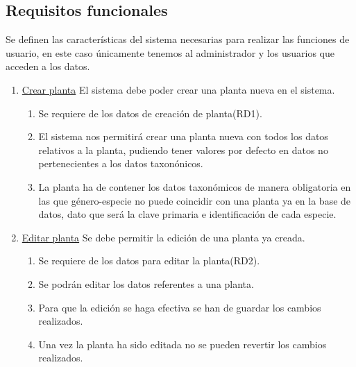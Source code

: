 \documentclass[10pt,a4paper]{article}
\begin{document}
\subsection{\textbf{Requisitos funcionales}}

Se definen las características del sistema necesarias para realizar las funciones de usuario, en este caso únicamente tenemos al administrador y los usuarios que acceden a los datos.

\bigskip

\begin{enumerate}[label=RF\arabic*. ,leftmargin=2.8\parindent]
	\item \underline{Crear planta}
	 \newline 
	 \newline
	El sistema debe poder crear una planta nueva en el sistema.
	\begin{enumerate}[label=-]
	
		\item Se requiere de los datos de creación de planta(RD1).
		\item El sistema nos permitirá crear una planta nueva con todos los datos relativos a la planta, pudiendo tener valores por defecto en datos no pertenecientes a los datos taxonónicos.
		\item La planta ha de contener los datos taxonómicos de manera obligatoria en las que género-especie no puede coincidir con una planta ya en la base de datos, dato que será la clave primaria e identificación de cada especie.
		
	\end{enumerate}

	\bigskip
	\item \underline{Editar planta}
	\newline \newline
	Se debe permitir la edición de una planta ya creada.
	\begin{enumerate}[label=-]
	\item Se requiere de los datos para editar la planta(RD2).
		\item Se podrán editar los datos referentes a una planta.
		\item Para que la edición se haga efectiva se han de guardar los cambios realizados.
		\item Una vez la planta ha sido editada no se pueden revertir los cambios realizados.

		
	\end{enumerate}


\end{enumerate}
\end{document}
